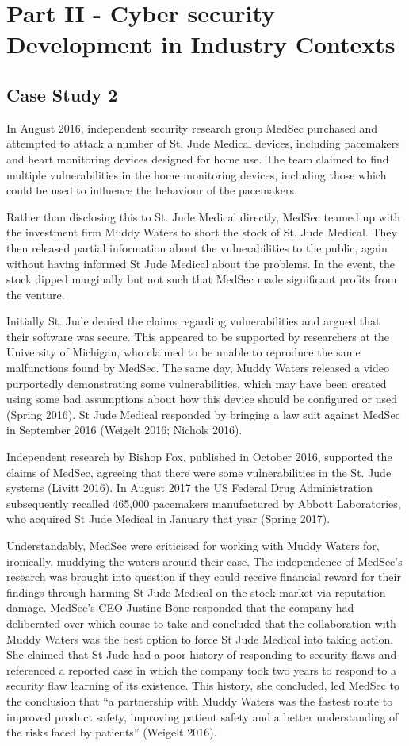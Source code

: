 \documentclass{svjour3}                     %
\begin{document}
\section{Part II - Cyber security Development in Industry Contexts }
\label{sec:practice}
\subsection{Case Study 2}
\label{sec:case2}
In August 2016, independent security research group MedSec purchased and attempted to attack a number of St. Jude Medical devices, including pacemakers and heart monitoring devices designed for home use. The team claimed to find multiple vulnerabilities in the home monitoring devices, including those which could be used to influence the behaviour of the pacemakers.

Rather than disclosing this to St. Jude Medical directly, MedSec teamed up with the investment firm Muddy Waters to short the stock of St. Jude Medical. They then released partial information about the vulnerabilities to the public, again without having informed St Jude Medical about the problems.  In the event, the stock dipped marginally but not such that MedSec made significant profits from the venture.

Initially St. Jude denied the claims regarding vulnerabilities and argued that their software was secure. This appeared to be supported by researchers at the University of Michigan, who claimed to be unable to reproduce the same malfunctions found by MedSec. The same day, Muddy Waters released a video purportedly demonstrating some vulnerabilities, which may have been created using some bad assumptions about how this device should be configured or used (Spring 2016). St Jude Medical responded by bringing a law suit against MedSec in September 2016 (Weigelt 2016; Nichols 2016).

Independent research by Bishop Fox, published in October 2016, supported the claims of MedSec, agreeing that there were some vulnerabilities in the St. Jude systems (Livitt 2016). In August 2017 the US Federal Drug Administration subsequently recalled 465,000 pacemakers manufactured by Abbott Laboratories, who acquired St Jude Medical in January that year (Spring 2017).

Understandably, MedSec were criticised for working with Muddy Waters for, ironically, muddying the waters around their case. The independence of MedSec’s research was brought into question if they could receive financial reward for their findings through harming St Jude Medical on the stock market via reputation damage. MedSec’s CEO Justine Bone responded that the company had deliberated over which course to take and concluded that the collaboration with Muddy Waters was the best option to force St Jude Medical into taking action.  She claimed that St Jude had a poor history of responding to security flaws and referenced a reported case in which the company took two years to respond to a security flaw learning of its existence.  This history, she concluded, led MedSec to the conclusion that “a partnership with Muddy Waters was the fastest route to improved product safety, improving patient safety and a better understanding of the risks faced by patients” (Weigelt 2016). 
\end{document}
